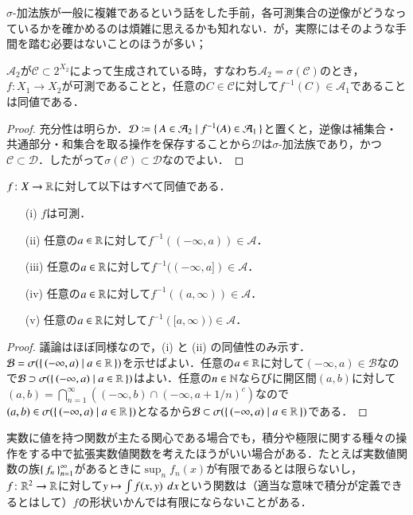 $\sigma$-加法族が一般に複雑であるという話をした手前，各可測集合の逆像がどうなっているかを確かめるのは煩雑に思えるかも知れない．が，実際にはそのような手間を踏む必要はないことのほうが多い；

\begin{lem}
$\mathcal{A}_2$が$\mathcal{C} \subset 2^{X_2}$によって生成されている時，すなわち$\mathcal{A}_2 = \sigma(\mathcal{C})$のとき，$f \colon X_1 \to X_2$が可測であることと，任意の$C \in \mathcal{C}$に対して$f^{-1}(C) \in \mathcal{A}_1$であることは同値である．
\end{lem}

\begin{proof}
充分性は明らか．$\mathcal{D} \coloneqq \set{ A \in \mathcal{A}_2 | f^{-1}(A) \in \mathcal{A}_1}$と置くと，逆像は補集合・共通部分・和集合を取る操作を保存することから$\mathcal{D}$は$\sigma$-加法族であり，かつ$\mathcal{C} \subset \mathcal{D}$．したがって$\sigma(\mathcal{C}) \subset \mathcal{D}$なのでよい．
\end{proof}

\begin{lem}
$f \colon X \to \mathbb{R}$に対して以下はすべて同値である．
\begin{enumerate}
\item[(i)] $f$は可測．
\item[(ii)] 任意の$a \in \mathbb{R}$に対して$f^{-1}((-\infty,a)) \in \mathcal{A}$．
\item[(iii)] 任意の$a \in \mathbb{R}$に対して$f^{-1}((-\infty,a]) \in \mathcal{A}$．
\item[(iv)] 任意の$a \in \mathbb{R}$に対して$f^{-1}((a,\infty)) \in \mathcal{A}$．
\item[(v)] 任意の$a \in \mathbb{R}$に対して$f^{-1}([a,\infty)) \in \mathcal{A}$．
\end{enumerate}
\end{lem}

\begin{proof}
議論はほぼ同様なので，(i) と (ii) の同値性のみ示す．$\mathcal{B} = \sigma(\set{(-\infty,a) | a \in \mathbb{R}})$を示せばよい．任意の$a \in \mathbb{R}$に対して$(-\infty,a) \in \mathcal{B}$なので$\mathcal{B} \supset \sigma(\set{(-\infty,a) | a \in \mathbb{R}})$はよい．任意の$n \in \mathbb{N}$ならびに開区間$(a,b)$に対して$(a,b) = \bigcap_{n=1}^\infty \left( (-\infty,b) \cap (-\infty, a+1/n)^c \right)$なので$(a,b) \in \sigma(\set{(-\infty,a) | a \in \mathbb{R}})$となるから$\mathcal{B} \subset \sigma(\set{(-\infty,a) | a \in \mathbb{R}})$である．
\end{proof}

実数に値を持つ関数が主たる関心である場合でも，積分や極限に関する種々の操作をする中で拡張実数値関数を考えたほうがいい場合がある．たとえば実数値関数の族$\set{f_n}_{n=1}^\infty$があるときに$\sup_n f_n(x)$が有限であるとは限らないし，$f \colon \mathbb{R}^2 \to \mathbb{R}$に対して$y \mapsto \int f(x,y)\ \mathop{}\!d x$という関数は（適当な意味で積分が定義できるとはして）$f$の形状いかんでは有限にならないことがある．

